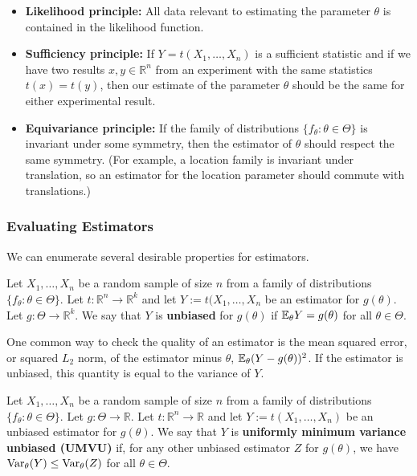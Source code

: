 \begin{itemize}

\item \textbf{Likelihood principle:} All data relevant to estimating the parameter \(\theta\) is contained in the likelihood function.

\item \textbf{Sufficiency principle:} If \(Y = t(X_1, \ldots, X_n)\) is a sufficient statistic and if we have two results \(x, y \in \mathbb{R}^n\) from an experiment with the same statistics \(t(x) = t(y)\), then our estimate of the parameter \(\theta\) should be the same for either experimental result.

\item \textbf{Equivariance principle:} If the family of distributions \(\{f_\theta: \theta \in \Theta\}\)  is invariant under some symmetry, then the estimator of \(\theta\) should respect the same symmetry. (For example, a location family is invariant under translation, so an estimator for the location parameter should commute with translations.)

\end{itemize}

\subsubsection{Evaluating Estimators}

We can enumerate several desirable properties for estimators.

\begin{definition}Let \(X_1, \ldots, X_n\) be a random sample of size \(n\) from a family of distributions \(\{f_\theta: \theta \in \Theta\}\). Let \(t: \mathbb{R}^n \to \mathbb{R}^k\) and let \(Y:= t(X_1, \ldots, X_n\) be an estimator for \(g(\theta)\). Let \(g:\Theta \to \mathbb{R}^k\). We say that \(Y\) is \textbf{unbiased} for \(g(\theta)\) if \(\E_\theta Y = g(\theta)\) for all \(\theta \in \Theta\).

\end{definition}

One common way to check the quality of an estimator is the mean squared error, or squared \(L_2\) norm, of the estimator minus \(\theta\), \(\E_\theta(Y- g(\theta))^2\). If the estimator is unbiased, this quantity is equal to the variance of \(Y\).

\begin{definition}Let \(X_1, \ldots, X_n\) be a random sample of size \(n\) from a family of distributions \(\{f_\theta: \theta \in \Theta\}\). Let \(g: \Theta \to \mathbb{R}\). Let \(t: \mathbb{R}^n \to \mathbb{R}\) and let \(Y:= t(X_1, \ldots, X_n)\) be an unbiased estimator for \(g(\theta)\). We say that \(Y\) is \textbf{uniformly minimum variance unbiased (UMVU)} if, for any other unbiased estimator \(Z\) for \(g(\theta)\), we have \(\Var_\theta(Y) \leq \Var_\theta(Z)\) for all \(\theta \in \Theta\).

\end{definition}

